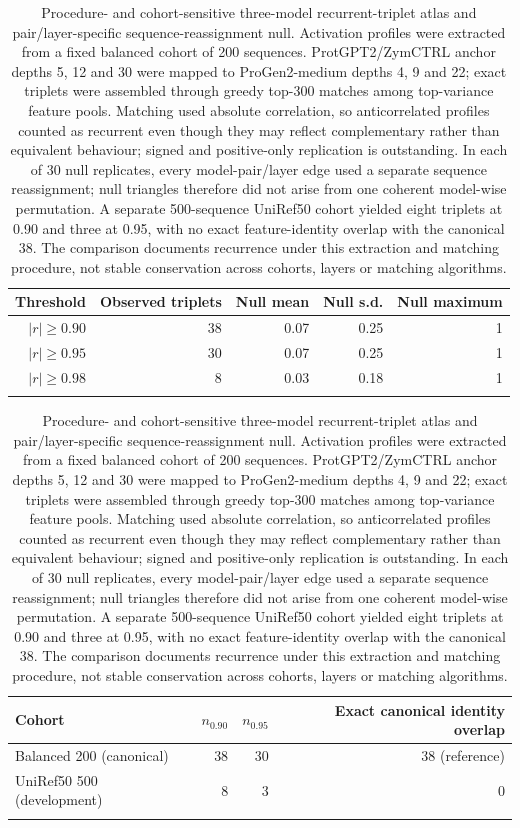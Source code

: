\documentclass[pdflatex,sn-nature]{sn-jnl}
\begin{document}
\clearpage

\begin{table}[p!]
\caption{Procedure- and cohort-sensitive three-model recurrent-triplet atlas and pair/layer-specific sequence-reassignment null. Activation profiles were extracted from a fixed balanced cohort of 200 sequences. ProtGPT2/ZymCTRL anchor depths 5, 12 and 30 were mapped to ProGen2-medium depths 4, 9 and 22; exact triplets were assembled through greedy top-300 matches among top-variance feature pools. Matching used absolute correlation, so anticorrelated profiles counted as recurrent even though they may reflect complementary rather than equivalent behaviour; signed and positive-only replication is outstanding. In each of 30 null replicates, every model-pair/layer edge used a separate sequence reassignment; null triangles therefore did not arise from one coherent model-wise permutation. A separate 500-sequence UniRef50 cohort yielded eight triplets at 0.90 and three at 0.95, with no exact feature-identity overlap with the canonical 38. The comparison documents recurrence under this extraction and matching procedure, not stable conservation across cohorts, layers or matching algorithms.}
\label{tab:supp-atlas}
\begin{tabular}{@{}rrrrr@{}}
\toprule
Threshold & Observed triplets & Null mean & Null s.d. & Null maximum \\
\midrule
$|r|\geq 0.90$ & 38 & 0.07 & 0.25 & 1 \\
$|r|\geq 0.95$ & 30 & 0.07 & 0.25 & 1 \\
$|r|\geq 0.98$ & 8 & 0.03 & 0.18 & 1 \\
\botrule
\end{tabular}

\medskip
\begin{tabular}{@{}lrrr@{}}
\toprule
Cohort & $n_{0.90}$ & $n_{0.95}$ & Exact canonical identity overlap \\
\midrule
Balanced 200 (canonical) & 38 & 30 & 38 (reference) \\
UniRef50 500 (development) & 8 & 3 & 0 \\
\botrule
\end{tabular}
\end{table}

\clearpage
\end{document}
